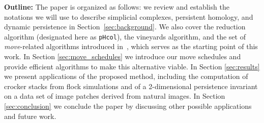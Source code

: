 \documentclass[sn-mathphys]{sn-jnl}
\newtheorem{proposition}{Proposition}
\begin{document}
\noindent 
\textbf{Outline:} The paper is organized as follows: we review and establish the notations we will use to describe simplicial complexes, persistent homology, and dynamic persistence in Section~\ref{sec:background}. 
We also cover the reduction algorithm (designated here as \texttt{pHcol}), the vineyards algorithm, and the set of \emph{move}-related algorithms introduced in~\cite{busaryev2010tracking}, which serves as the starting point of this work. 
In Section \ref{sec:move_schedules} we introduce our move schedules  and provide efficient algorithms to make this alternative viable. 
In Section \ref{sec:results} we present applications of the proposed method, including the computation of crocker stacks from flock simulations and of a 2-dimensional persistence invariant on a data set of image patches derived from natural images. 
In Section \ref{sec:conclusion} we conclude the paper by discussing other possible applications and future work. 

\end{document}
